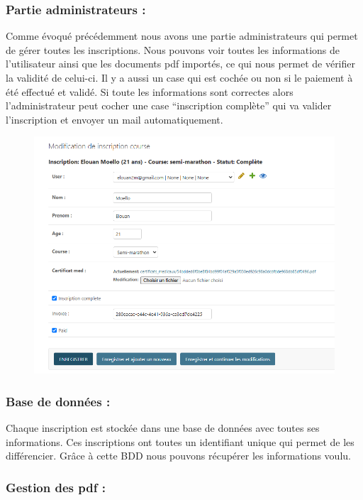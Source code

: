 \documentclass[12pt]{article} %
\begin{document}
        \subsubsection{Partie administrateurs :}
            Comme évoqué précédemment nous avons une partie administrateurs qui permet de gérer toutes les inscriptions. Nous pouvons voir toutes les informations de l'utilisateur ainsi que les documents pdf importés, ce qui nous permet de vérifier la validité de celui-ci. Il y a aussi un case qui est cochée ou non si le paiement à été effectué et validé. Si toute les informations sont correctes alors l'administrateur peut cocher une case “inscription complète” qui va valider l’inscription et envoyer un mail automatiquement.

            \begin{figure}[hbtp]
            \centering
            \includegraphics[scale=0.6]{images/admin_gestion.PNG}
            \end{figure}
            \newpage
        \subsubsection{Base de données :}
            Chaque inscription est stockée dans une base de données avec toutes ses informations. Ces inscriptions ont toutes un identifiant unique qui permet de les différencier. Grâce à cette BDD nous pouvons récupérer les informations voulu.
            
        \subsubsection{Gestion des pdf :} 
\end{document}
